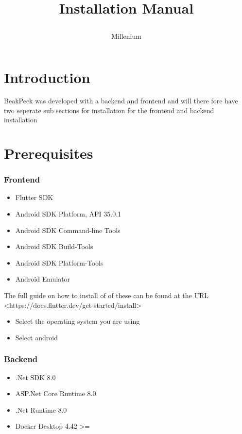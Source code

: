 \documentclass{article}
\title{

\\
{Installation Manual}
}
\author{Millenium}
\begin{document}
\tableofcontents

\newpage


\section{Introduction}


BeakPeek was developed with a backend and frontend and will there fore have two
seperate sub sections for installation for the frontend and backend installation

\section{Prerequisites}

\subsubsection{Frontend}

\begin{itemize}
    \item Flutter SDK
    \item Android SDK Platform, API 35.0.1
    \item Android SDK Command-line Tools
    \item Android SDK Build-Tools
    \item Android SDK Platform-Tools
    \item Android Emulator
\end{itemize}

The full guide on how to install of of these can be found at the URL
<https://docs.flutter.dev/get-started/install>

\begin{itemize}
    \item Select the operating system you are using
    \item Select android
\end{itemize}

\subsubsection{Backend}

\begin{itemize}
    \item .Net SDK 8.0
    \item ASP.Net Core Runtime 8.0
    \item .Net Runtime 8.0
    \item Docker Desktop 4.42 >=
\end{itemize}
\end{document}
